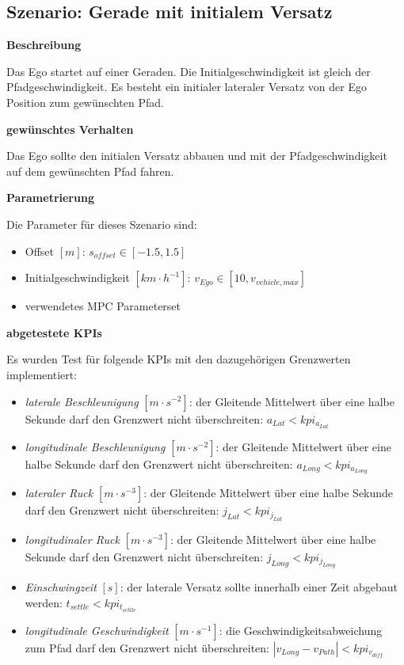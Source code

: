 \subsection{Szenario: Gerade mit initialem Versatz}
\textbf{Beschreibung}

\noindent Das Ego startet auf einer Geraden. Die Initialgeschwindigkeit ist gleich der Pfadgeschwindigkeit. Es besteht ein initialer lateraler Versatz von der Ego Position zum gewünschten Pfad.

\bigskip\noindent\textbf{gewünschtes Verhalten}

\noindent Das Ego sollte den initialen Versatz abbauen und mit der Pfadgeschwindigkeit auf dem gewünschten Pfad fahren.

\bigskip\noindent\textbf{Parametrierung}

\noindent Die Parameter für dieses Szenario sind:
\begin{itemize}
    \item Offset $[m]$: $s_{offset} \in [-1.5,1.5]$ 
    \item Initialgeschwindigkeit $[km\cdot h^{-1}]$: $v_{Ego} \in [10,v_{vehicle,max}]$
    \item verwendetes MPC Parameterset 
\end{itemize}

\bigskip\noindent\textbf{abgetestete KPIs}

\noindent Es wurden Test für folgende KPIs mit den dazugehörigen Grenzwerten implementiert:
\begin{itemize}
    \item \textit{laterale Beschleunigung} $[m\cdot s^{-2}]$: der Gleitende Mittelwert über eine halbe Sekunde darf den Grenzwert nicht überschreiten: $a_{Lat} < kpi_{a_{Lat}}$
    \item \textit{longitudinale Beschleunigung} $[m\cdot s^{-2}]$: der Gleitende Mittelwert über eine halbe Sekunde darf den Grenzwert nicht überschreiten: $a_{Long} < kpi_{a_{Long}}$
    \item \textit{lateraler Ruck} $[m\cdot s^{-3}]$: der Gleitende Mittelwert über eine halbe Sekunde darf den Grenzwert nicht überschreiten: $j_{Lat} < kpi_{j_{Lat}}$
    \item \textit{longitudinaler Ruck} $[m\cdot s^{-3}]$: der Gleitende Mittelwert über eine halbe Sekunde darf den Grenzwert nicht überschreiten: $j_{Long} < kpi_{j_{Long}}$
    \item \textit{Einschwingzeit} $[s]$: der laterale Versatz sollte innerhalb einer Zeit abgebaut werden: $t_{settle} < kpi_{t_{settle}}$
    \item \textit{longitudinale Geschwindigkeit} $[m\cdot s^{-1}]$: die Geschwindigkeitsabweichung zum Pfad darf den Grenzwert nicht überschreiten: $|v_{Long} - v_{Path}| < kpi_{v_{diff}}$
\end{itemize}

